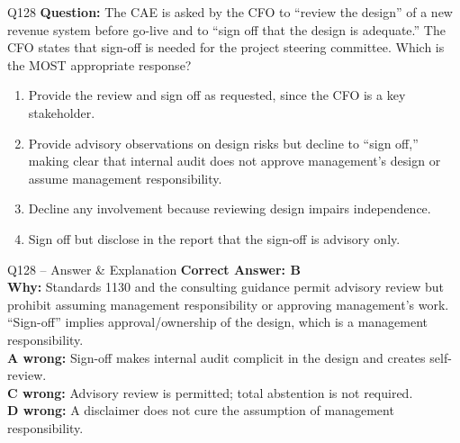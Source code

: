 \documentclass[aspectratio=169,10pt]{beamer}
\begin{document}
	\begin{frame}[t]{Q128}
		\small
		\textbf{Question:} The CAE is asked by the CFO to ``review the design'' of a new revenue system before go-live and to ``sign off that the design is adequate.'' The CFO states that sign-off is needed for the project steering committee. Which is the MOST appropriate response?
		\begin{enumerate}[label=\Alph*.,itemsep=1pt,topsep=2pt]
			\item Provide the review and sign off as requested, since the CFO is a key stakeholder.
			\item Provide advisory observations on design risks but decline to ``sign off,'' making clear that internal audit does not approve management's design or assume management responsibility.
			\item Decline any involvement because reviewing design impairs independence.
			\item Sign off but disclose in the report that the sign-off is advisory only.
		\end{enumerate}
	\end{frame}
	
	\begin{frame}[t]{Q128 -- Answer \& Explanation}
		\small
		\textbf{Correct Answer: B} \\[4pt]
		\textbf{Why:} Standards 1130 and the consulting guidance permit advisory review but prohibit assuming management responsibility or approving management's work. ``Sign-off'' implies approval/ownership of the design, which is a management responsibility. \\[4pt]
		\textbf{A wrong:} Sign-off makes internal audit complicit in the design and creates self-review. \\[2pt]
		\textbf{C wrong:} Advisory review is permitted; total abstention is not required. \\[2pt]
		\textbf{D wrong:} A disclaimer does not cure the assumption of management responsibility.
	\end{frame}
	
\end{document}
